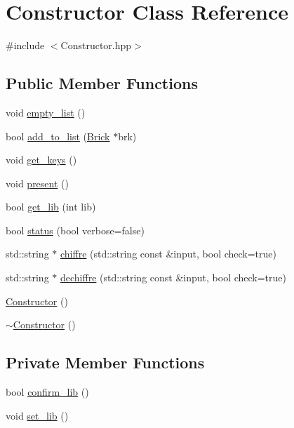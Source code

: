 \hypertarget{class_constructor}{}\section{Constructor Class Reference}
\label{class_constructor}


{\ttfamily \#include $<$Constructor.\+hpp$>$}

\subsection*{Public Member Functions}
\begin{DoxyCompactItemize}
\item 
void \hyperlink{class_constructor_a16340d50e229caed0d47e81fce95c4f8}{empty\+\_\+list} ()
\item 
bool \hyperlink{class_constructor_a3ca288fc4d5810544a9a3f141202ef85}{add\+\_\+to\+\_\+list} (\hyperlink{class_brick}{Brick} $\ast$brk)
\item 
void \hyperlink{class_constructor_acb69aa2f0d5ad0cdd4f37e2b4e288c28}{get\+\_\+keys} ()
\item 
void \hyperlink{class_constructor_a74c8aab139271c296b7f262b3a2043ea}{present} ()
\item 
bool \hyperlink{class_constructor_a2ecbaf8362625b0760b48f25e36aaeb8}{get\+\_\+lib} (int lib)
\item 
bool \hyperlink{class_constructor_a6f1bf00a6307ee4031066a027dbda079}{status} (bool verbose=false)
\item 
std\+::string $\ast$ \hyperlink{class_constructor_a230d769b93b596cc177543937de05589}{chiffre} (std\+::string const \&input, bool check=true)
\item 
std\+::string $\ast$ \hyperlink{class_constructor_ab47a8bcdd1294c9df31a1ba4e36cff6f}{dechiffre} (std\+::string const \&input, bool check=true)
\item 
\hyperlink{class_constructor_acdc7d45fb66d127f7f954fdd683415dc}{Constructor} ()
\item 
\hyperlink{class_constructor_a4ad4d817192fadf79f16b2a4b72d86a9}{$\sim$\+Constructor} ()
\end{DoxyCompactItemize}
\subsection*{Private Member Functions}
\begin{DoxyCompactItemize}
\item 
bool \hyperlink{class_constructor_ad0f9e7362e27e74fbe3e8710ece78450}{confirm\+\_\+lib} ()
\item 
void \hyperlink{class_constructor_ac49e308a44a30c313b61c7bed07e4555}{set\+\_\+lib} ()
\end{DoxyCompactItemize}
